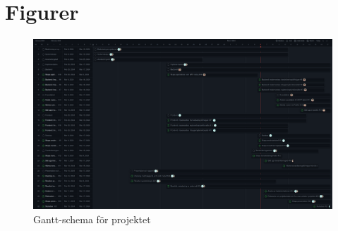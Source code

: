 \chapter{Figurer}

\begin{figure}[h]
  \centering
  \includegraphics[width=1\textwidth]{images/gantt}
  \caption{Gantt-schema för projektet}
  \label{fig:gantt}
\end{figure}